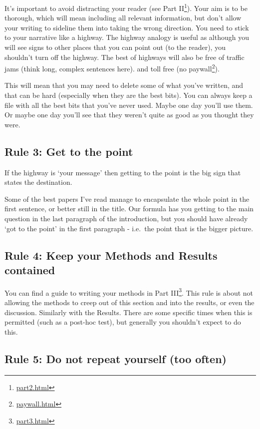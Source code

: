 \documentclass[
]{krantz}
\renewcommand{\href}[2]{#2\footnote{\url{#1}}}
\begin{document}
It's important to avoid distracting your reader (see \href{part2.html}{Part II}). Your aim is to be thorough, which will mean including all relevant information, but don't allow your writing to sideline them into taking the wrong direction. You need to stick to your narrative like a highway. The highway analogy is useful as although you will see signs to other places that you can point out (to the reader), you shouldn't turn off the highway. The best of highways will also be free of traffic jams (think long, complex sentences here). and toll free (\href{paywall.html}{no paywall}).

This will mean that you may need to delete some of what you've written, and that can be hard (especially when they are the best bits). You can always keep a file with all the best bits that you've never used. Maybe one day you'll use them. Or maybe one day you'll see that they weren't quite as good as you thought they were.

\hypertarget{rule-3-get-to-the-point}{%
\subsection{Rule 3: Get to the point}\label{rule-3-get-to-the-point}}

If the highway is `your message' then getting to the point is the big sign that states the destination.

Some of the best papers I've read manage to encapsulate the whole point in the first sentence, or better still in the title. Our formula has you getting to the main question in the last paragraph of the introduction, but you should have already `got to the point' in the first paragraph - i.e.~the point that is the bigger picture.

\hypertarget{rule-4-keep-your-methods-and-results-contained}{%
\subsection{Rule 4: Keep your Methods and Results contained}\label{rule-4-keep-your-methods-and-results-contained}}

You can find a guide to writing your methods in \href{part3.html}{Part III}. This rule is about not allowing the methods to creep out of this section and into the results, or even the discussion. Similarly with the Results. There are some specific times when this is permitted (such as a post-hoc test), but generally you shouldn't expect to do this.

\hypertarget{rule-5-do-not-repeat-yourself-too-often}{%
\subsection{Rule 5: Do not repeat yourself (too often)}\label{rule-5-do-not-repeat-yourself-too-often}}
\end{document}
